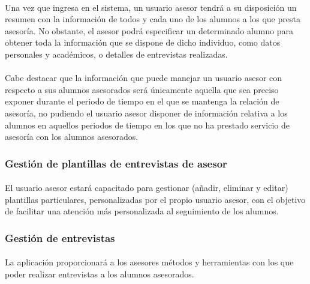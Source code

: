       \paragraph{}Una vez que ingresa en el sistema, un usuario asesor tendrá
      a su disposición un resumen con la información de todos y cada uno de los
      alumnos a los que presta asesoría. No obstante, el asesor podrá
      especificar un determinado alumno para obtener toda la información que
      se dispone de dicho individuo, como datos personales y académicos, o
      detalles de entrevistas realizadas.

      \paragraph{}Cabe destacar que la información que puede manejar un usuario
      asesor con respecto a sus alumnos asesorados será únicamente aquella
      que sea preciso exponer durante el periodo de tiempo en el que se mantenga
      la relación de asesoría, no pudiendo el usuario asesor disponer
      de información relativa a los alumnos en aquellos periodos de tiempo en
      los que no ha prestado servicio de asesoría con los alumnos asesorados.

      \subsubsection{Gestión de plantillas de entrevistas de asesor}

      \paragraph{}El usuario asesor estará capacitado para gestionar
      (añadir, eliminar y editar) plantillas particulares, personalizadas
      por el propio usuario asesor, con el objetivo de facilitar una atención
      más personalizada al seguimiento de los alumnos.

      \subsubsection{Gestión de entrevistas}

      \paragraph{}La aplicación proporcionará a los asesores métodos y
      herramientas con los que poder realizar entrevistas a los alumnos
      asesorados.

